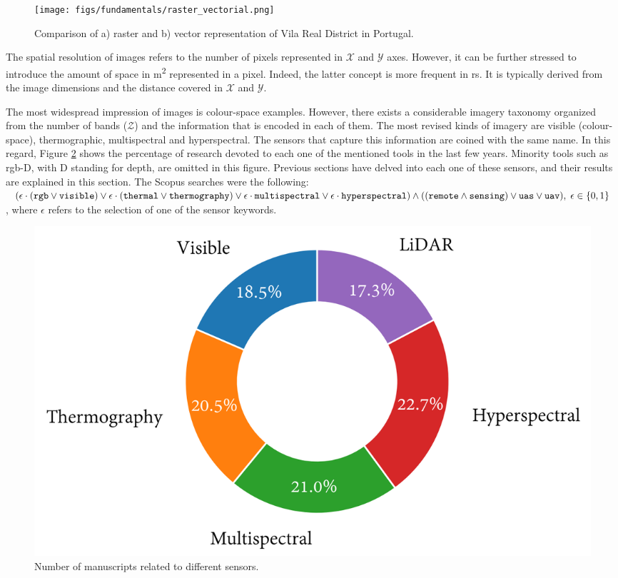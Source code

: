 \begin{figure}[ht]
	\texttt{[image: figs/fundamentals/raster\_vectorial.png]}
	\caption{Comparison of a) raster and b) vector representation of Vila Real District in Portugal.  }
    \label{fig:raster_vectorial}
\end{figure}

The spatial resolution of images refers to the number of pixels represented in $\mathcal{X}$ and $\mathcal{Y}$ axes. However, it can be further stressed to introduce the amount of space in \si{\meter^2} represented in a pixel. Indeed, the latter concept is more frequent in \acrshort{rs}. It is typically derived from the image dimensions and the distance covered in $\mathcal{X}$ and $\mathcal{Y}$.

The most widespread impression of images is colour-space examples. However, there exists a considerable imagery taxonomy organized from the number of bands ($\mathcal{Z}$) and the information that is encoded in each of them. The most revised kinds of imagery are visible (colour-space), thermographic, multispectral and hyperspectral. The sensors that capture this information are coined with the same name. In this regard, Figure \ref{fig:sensor_literature} shows the percentage of research devoted to each one of the mentioned tools in the last few years. Minority tools such as \acrshort{rgb}-D, with D standing for depth, are omitted in this figure. Previous sections have delved into each one of these sensors, and their results are explained in this section. The Scopus searches were the following: $(\epsilon \cdot (\mathtt{rgb} \lor \mathtt{visible}) \lor \epsilon \cdot (\mathtt{thermal} \lor \mathtt{thermography}) \lor \epsilon \cdot \mathtt{multispectral} \lor \epsilon \cdot \mathtt{hyperspectral}) \land ((\mathtt{remote} \land \mathtt{sensing}) \lor \mathtt{uas} \lor \mathtt{uav}), \hspace{1mm} \epsilon \in \{0, 1\}$, where $\epsilon$ refers to the selection of one of the sensor keywords. 

\begin{figure}[ht]
	\includegraphics[width=.9\textwidth]{figs/fundamentals/literature_sensors.png}
	\caption{Number of manuscripts related to different sensors.  }
    \label{fig:sensor_literature}
\end{figure}

